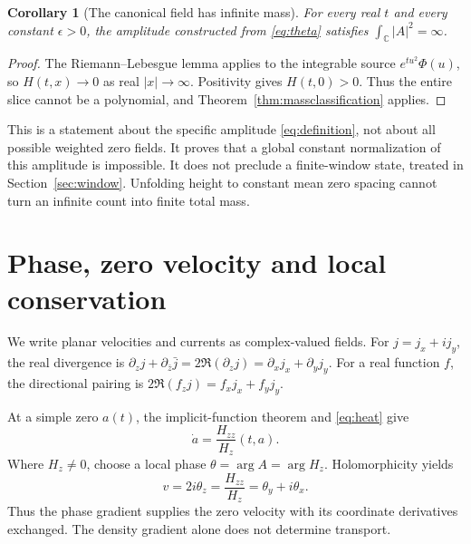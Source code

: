 \documentclass[11pt]{article}
\newcommand{\C}{\mathbb C}
\newcommand{\eps}{\epsilon}
\newtheorem{corollary}[theorem]{Corollary}
\theoremstyle{definition}
\theoremstyle{remark}
\begin{document}
\begin{corollary}[The canonical field has infinite mass]
For every real $t$ and every constant $\eps>0$, the amplitude constructed
from \eqref{eq:theta} satisfies $\int_\C|A|^2=\infty$.
\end{corollary}
\begin{proof}
The Riemann--Lebesgue lemma applies to the integrable source
$e^{tu^2}\Phi(u)$, so $H(t,x)\to0$ as real $|x|\to\infty$.
Positivity gives $H(t,0)>0$. Thus the entire slice cannot be a
polynomial, and Theorem~\ref{thm:massclassification} applies.
\end{proof}

This is a statement about the specific amplitude \eqref{eq:definition},
not about all possible weighted zero fields. It proves that a global
constant normalization of this amplitude is impossible. It does not
preclude a finite-window state, treated in Section~\ref{sec:window}.
Unfolding height to constant mean zero spacing cannot turn an infinite
count into finite total mass.

\section{Phase, zero velocity and local conservation}
\label{sec:transport}

We write planar velocities and currents as complex-valued fields.
For $j=j_x+ij_y$, the real divergence is
$\partial_zj+\partial_{\bar z}\bar j=2\Re(\partial_zj)
=\partial_xj_x+\partial_yj_y$.
For a real function $f$, the directional pairing is
$2\Re(f_zj)=f_xj_x+f_yj_y$.

At a simple zero $a(t)$, the implicit-function theorem and
\eqref{eq:heat} give
\begin{equation}
 \dot a=\frac{H_{zz}}{H_z}(t,a). \label{eq:zerovelocity}
\end{equation}
Where $H_z\ne0$, choose a local phase $\theta=\arg A=\arg H_z$.
Holomorphicity yields
\begin{equation}
 v=2i\theta_z=\frac{H_{zz}}{H_z}
   =\theta_y+i\theta_x.
 \label{eq:phasevelocity}
\end{equation}
Thus the phase gradient supplies the zero velocity with its coordinate
derivatives exchanged. The density gradient alone does not determine
transport.
\end{document}
